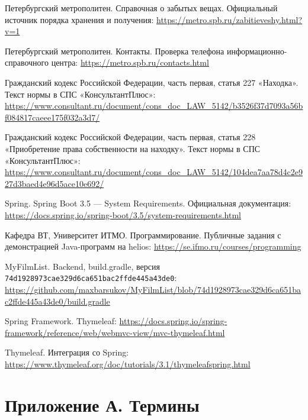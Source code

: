 \begin{enumerate}[label={[\arabic*]},leftmargin=10mm]
\RaggedRight
\item Петербургский метрополитен. Справочная о забытых вещах. Официальный источник порядка хранения и получения: \url{https://metro.spb.ru/zabitieveshy.html?v=1}
\item Петербургский метрополитен. Контакты. Проверка телефона информационно-справочного центра: \url{https://metro.spb.ru/contacts.html}
\item Гражданский кодекс Российской Федерации, часть первая, статья 227 «Находка». Текст нормы в СПС «КонсультантПлюс»: \url{https://www.consultant.ru/document/cons_doc_LAW_5142/b3526f37d7093a56bf084817caeee175f032a3d7/}
\item Гражданский кодекс Российской Федерации, часть первая, статья 228 «Приобретение права собственности на находку». Текст нормы в СПС «КонсультантПлюс»: \url{https://www.consultant.ru/document/cons_doc_LAW_5142/104dea7aa78d4c2e927d3baed4e96d5ace10e692/}
\item Spring. Spring Boot 3.5 — System Requirements. Официальная документация: \url{https://docs.spring.io/spring-boot/3.5/system-requirements.html}
\item Кафедра ВТ, Университет ИТМО. Программирование. Публичные задания с демонстрацией Java-программ на helios: \url{https://se.ifmo.ru/courses/programming}
\item My\allowbreak{}Film\allowbreak{}List. Backend, build.gradle, версия \nolinkurl{74d1928973cae329d6ca651bac2ffde445a43de0}: \url{https://github.com/maxbarsukov/MyFilmList/blob/74d1928973cae329d6ca651bac2ffde445a43de0/build.gradle}
\item Spring Framework. Thymeleaf: \url{https://docs.spring.io/spring-framework/reference/web/webmvc-view/mvc-thymeleaf.html}
\item Thymeleaf. Интеграция со Spring: \url{https://www.thymeleaf.org/doc/tutorials/3.1/thymeleafspring.html}
\end{enumerate}

\clearpage
\section*{Приложение А. Термины}
{}

